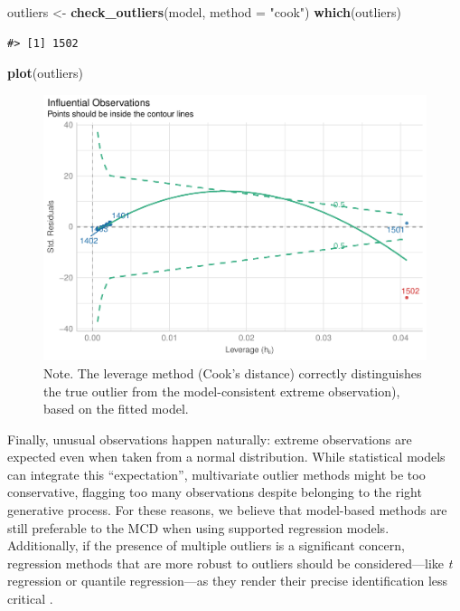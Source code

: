 \documentclass[sn-basic, lineno,pdflatex]{sn-jnl}
\newenvironment{Shaded}{\begin{snugshade}}{\end{snugshade}}
\newcommand{\AttributeTok}[1]{\textcolor[rgb]{0.13,0.29,0.53}{#1}}
\newcommand{\FunctionTok}[1]{\textcolor[rgb]{0.13,0.29,0.53}{\textbf{#1}}}
\newcommand{\NormalTok}[1]{#1}
\newcommand{\OtherTok}[1]{\textcolor[rgb]{0.56,0.35,0.01}{#1}}
\newcommand{\StringTok}[1]{\textcolor[rgb]{0.31,0.60,0.02}{#1}}
\begin{document}
\begin{Shaded}
\begin{Highlighting}[]
\NormalTok{outliers }\OtherTok{\textless{}{-}} \FunctionTok{check\_outliers}\NormalTok{(model, }\AttributeTok{method =} \StringTok{"cook"}\NormalTok{)}
\FunctionTok{which}\NormalTok{(outliers)}
\end{Highlighting}
\end{Shaded}

\begin{verbatim}
#> [1] 1502
\end{verbatim}

\begin{Shaded}
\begin{Highlighting}[]
\FunctionTok{plot}\NormalTok{(outliers)}
\end{Highlighting}
\end{Shaded}

\begin{figure}
\includegraphics[width=1\linewidth]{paper_files/figure-latex/model3-1} \caption{Note. The leverage method (Cook's distance) correctly distinguishes the true outlier from the model-consistent extreme observation), based on the fitted model.}\label{fig:model3}
\end{figure}

Finally, unusual observations happen naturally: extreme observations are
expected even when taken from a normal distribution. While statistical
models can integrate this ``expectation'', multivariate outlier methods
might be too conservative, flagging too many observations despite
belonging to the right generative process. For these reasons, we believe
that model-based methods are still preferable to the MCD when using
supported regression models. Additionally, if the presence of multiple
outliers is a significant concern, regression methods that are more
robust to outliers should be considered---like \emph{t} regression or
quantile regression---as they render their precise identification less
critical \citep{mcelreath2020statistical}.
\end{document}
